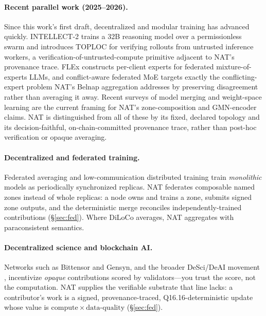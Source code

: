 \documentclass[11pt]{article}
\newcommand{\Qff}{Q16.16}
\begin{document}
\paragraph{Recent parallel work (2025--2026).}
Since this work's first draft, decentralized and modular training has advanced quickly. INTELLECT-2
\citep{primeintellect2025intellect2} trains a 32B reasoning model over a permissionless swarm and
introduces TOPLOC for verifying rollouts from untrusted inference workers, a
verification-of-untrusted-compute primitive adjacent to NAT's provenance trace. FLEx
\citep{flex2025} constructs per-client experts for federated mixture-of-experts LLMs, and
conflict-aware federated MoE \citep{conflictmoe2026} targets exactly the conflicting-expert problem
NAT's Belnap aggregation addresses by preserving disagreement rather than averaging it away. Recent
surveys of model merging \citep{modelmerging2026survey} and weight-space learning
\citep{weightspace2026survey} are the current framing for NAT's zone-composition and GMN-encoder
claims. NAT is distinguished from all of these by its fixed, declared topology and its
decision-faithful, on-chain-committed provenance trace, rather than post-hoc verification or opaque
averaging.

\paragraph{Decentralized and federated training.}
Federated averaging \citep{mcmahan2017communication} and low-communication distributed training
\citep{douillard2023diloco,prime2024opendiloco} train \emph{monolithic} models as periodically
synchronized replicas. NAT federates composable named zones instead of whole replicas: a node owns
and trains a zone, submits signed zone outputs, and the deterministic merge reconciles
independently-trained contributions (\S\ref{sec:fed}). Where DiLoCo averages, NAT aggregates with
paraconsistent semantics.

\paragraph{Decentralized science and blockchain AI.}
Networks such as Bittensor and Gensyn, and the broader DeSci/DeAI movement \citep{wang2024sok},
incentivize \emph{opaque} contributions scored by validators---you trust the score, not the
computation. NAT supplies the verifiable substrate that line lacks: a contributor's work is a signed,
provenance-traced, \Qff{}-deterministic update whose value is
$\mathrm{compute}\times\mathrm{data\text{-}quality}$ (\S\ref{sec:fed}).
\end{document}
